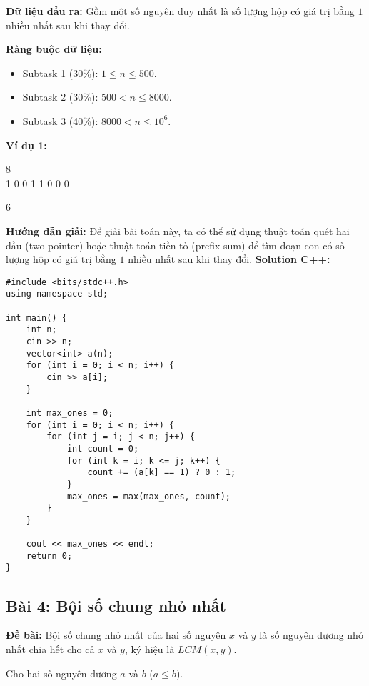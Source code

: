 \documentclass[12pt]{scrartcl}  %
\begin{document}
\textbf{Dữ liệu đầu ra:}
Gồm một số nguyên duy nhất là số lượng hộp có giá trị bằng $1$ nhiều nhất sau khi thay đổi.

\textbf{Ràng buộc dữ liệu:}
\begin{itemize}
    \item Subtask 1 (30\%): $1 \leq n \leq 500$.
    \item Subtask 2 (30\%): $500 < n \leq 8000$.
    \item Subtask 3 (40\%): $8000 < n \leq 10^6$.
\end{itemize}

\textbf{Ví dụ 1:}
\begin{tcolorbox}[colback=gray!5!white, colframe=blue!50!black, title=Input]
8\\
1 0 0 1 1 0 0 0
\end{tcolorbox}
\begin{tcolorbox}[colback=gray!5!white, colframe=green!50!black, title=Output]
6
\end{tcolorbox}

\textbf{Hướng dẫn giải:}
Để giải bài toán này, ta có thể sử dụng thuật toán quét hai đầu (two-pointer) hoặc thuật toán tiền tố (prefix sum) để tìm đoạn con có số lượng hộp có giá trị bằng $1$ nhiều nhất sau khi thay đổi.
\textbf{Solution C++:}
\begin{lstlisting}
#include <bits/stdc++.h>
using namespace std;

int main() {
    int n;
    cin >> n;
    vector<int> a(n);
    for (int i = 0; i < n; i++) {
        cin >> a[i];
    }

    int max_ones = 0;
    for (int i = 0; i < n; i++) {
        for (int j = i; j < n; j++) {
            int count = 0;
            for (int k = i; k <= j; k++) {
                count += (a[k] == 1) ? 0 : 1;
            }
            max_ones = max(max_ones, count);
        }
    }

    cout << max_ones << endl;
    return 0;
}
\end{lstlisting}

\subsection{Bài 4: Bội số chung nhỏ nhất}

\textbf{Đề bài:}
Bội số chung nhỏ nhất của hai số nguyên $x$ và $y$ là số nguyên dương nhỏ nhất chia hết cho cả $x$ và $y$, ký hiệu là $LCM(x, y)$.

Cho hai số nguyên dương $a$ và $b$ ($a \leq b$).
\end{document}
